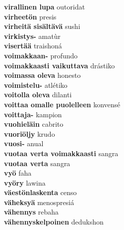 \textbf{ virallinen lupa  } outoridat \\
\textbf{ virheetön  } presis \\
\textbf{ virheitä sisältävä  } sushi \\
\textbf{ virkistys-  } amatùr \\
\textbf{ visertää  } traishoná \\
\textbf{ voimakkaan-  } profundo \\
\textbf{ voimakkaasti vaikuttava  } drástiko \\
\textbf{ voimassa oleva  } honesto \\
\textbf{ voimistelu-  } atlétiko \\
\textbf{ voitolla oleva  } dilanti \\
\textbf{ voittaa omalle puolelleen  } konvensé \\
\textbf{ voittaja-  } kampion \\
\textbf{ vuohieläin  } cabrito \\
\textbf{ vuoriöljy  } krudo \\
\textbf{ vuosi-  } anual \\
\textbf{ vuotaa verta voimakkaasti  } sangra \\
\textbf{ vuotaa verta  } sangra \\
\textbf{ vyö  } faha \\
\textbf{ vyöry  } lawina \\
\textbf{ väestönlaskenta  } censo \\
\textbf{ väheksyä  } menospresiá \\
\textbf{ vähennys  } rebaha \\
\textbf{ vähennyskelpoinen  } dedukshon \\
